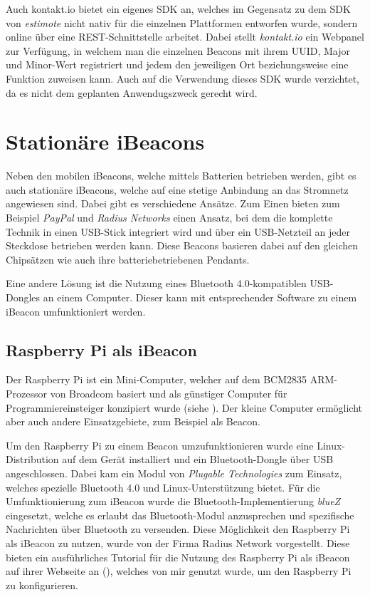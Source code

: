 Auch kontakt.io bietet ein eigenes SDK an, welches im Gegensatz zu dem SDK von \emph{estimote} nicht nativ für die einzelnen Plattformen entworfen wurde, sondern online über eine REST-Schnittstelle arbeitet.
Dabei stellt \emph{kontakt.io} ein Webpanel zur Verfügung, in welchem man die einzelnen Beacons mit ihrem UUID, Major und Minor-Wert registriert und jedem den jeweiligen Ort beziehungsweise eine Funktion zuweisen kann. 
Auch auf die Verwendung dieses SDK wurde verzichtet, da es nicht dem geplanten Anwendugszweck gerecht wird.


\section{Stationäre iBeacons}
\label{sec:dataandmeasurement:stationarybeacon}
Neben den mobilen iBeacons, welche mittels Batterien betrieben werden, gibt es auch stationäre iBeacons, welche auf eine stetige Anbindung an das Stromnetz angewiesen sind.
Dabei gibt es verschiedene Ansätze.
Zum Einen bieten zum Beispiel \emph{PayPal} und \emph{Radius Networks} einen Ansatz, bei dem die komplette Technik in einen USB-Stick integriert wird und über ein USB-Netzteil an jeder Steckdose betrieben werden kann. Diese Beacons basieren dabei auf den gleichen Chipsätzen wie auch ihre batteriebetriebenen Pendants.

Eine andere Lösung ist die Nutzung eines Bluetooth 4.0-kompatiblen USB-Dongles an einem Computer. Dieser kann mit entsprechender Software zu einem iBeacon umfunktioniert werden.

\subsection{Raspberry Pi als iBeacon}
\label{sec:dataandmeasurement:stationarybeacon:raspberrypi}
Der Raspberry Pi ist ein Mini-Computer, welcher auf dem BCM2835 ARM-Prozessor von Broadcom basiert und als günstiger Computer für Programmiereinsteiger konzipiert wurde (siehe \citet{raspberrypi}). Der kleine Computer ermöglicht aber auch andere Einsatzgebiete, zum Beispiel als Beacon.

Um den Raspberry Pi zu einem Beacon umzufunktionieren wurde eine Linux-Distribution auf dem Gerät installiert und ein Bluetooth-Dongle über USB angeschlossen. Dabei kam ein Modul von \emph{Plugable Technologies} zum Einsatz, welches spezielle Bluetooth 4.0 und Linux-Unterstützung bietet.
Für die Umfunktionierung zum iBeacon wurde die Bluetooth-Implementierung \emph{blueZ} eingesetzt, welche es erlaubt das Bluetooth-Modul anzusprechen und spezifische Nachrichten über Bluetooth zu versenden.
Diese Möglichkeit den Raspberry Pi als iBeacon zu nutzen, wurde von der Firma Radius Network vorgestellt. Diese bieten ein ausführliches Tutorial für die Nutzung des Raspberry Pi als iBeacon auf ihrer Webseite an (\citet{radiusraspberry}), welches von mir genutzt wurde, um den Raspberry Pi zu konfigurieren.

